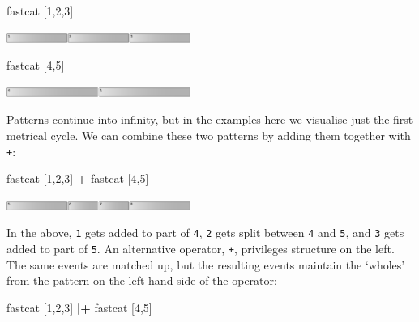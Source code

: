 \documentclass{nime-alternate} %
\newenvironment{Shaded}{\begin{snugshade}}{\end{snugshade}}
\newcommand{\DecValTok}[1]{\textcolor[rgb]{0.00,0.00,0.81}{#1}}
\newcommand{\NormalTok}[1]{#1}
\newcommand{\OperatorTok}[1]{\textcolor[rgb]{0.81,0.36,0.00}{\textbf{#1}}}
\begin{document}
\begin{Shaded}
\begin{Highlighting}[]
\NormalTok{fastcat [}\DecValTok{1}\NormalTok{,}\DecValTok{2}\NormalTok{,}\DecValTok{3}\NormalTok{]}
\end{Highlighting}
\end{Shaded}

\includegraphics[width=0.45\textwidth]{figures/2efc8e658200e8b94a2bd3f87ef273ce_0.pdf}

\begin{Shaded}
\begin{Highlighting}[]
\NormalTok{fastcat [}\DecValTok{4}\NormalTok{,}\DecValTok{5}\NormalTok{]}
\end{Highlighting}
\end{Shaded}

\includegraphics[width=0.45\textwidth]{figures/a5de1a12bad00c7c2d103e9b5e3f75f5_0.pdf}

Patterns continue into infinity, but in the examples here we visualise
just the first metrical cycle. We can combine these two patterns by
adding them together with \texttt{+}:

\begin{Shaded}
\begin{Highlighting}[]
\NormalTok{fastcat [}\DecValTok{1}\NormalTok{,}\DecValTok{2}\NormalTok{,}\DecValTok{3}\NormalTok{] }\OperatorTok{+}\NormalTok{ fastcat [}\DecValTok{4}\NormalTok{,}\DecValTok{5}\NormalTok{]}
\end{Highlighting}
\end{Shaded}

\includegraphics[width=0.45\textwidth]{figures/5a95fc0670ae3bb993fa97b33c8937f8_0.pdf}

In the above, \texttt{1} gets added to part of \texttt{4}, \texttt{2}
gets split between \texttt{4} and \texttt{5}, and \texttt{3} gets added
to part of \texttt{5}. An alternative operator, \texttt{\textbar{}+},
privileges structure on the left. The same events are matched up, but
the resulting events maintain the `wholes' from the pattern on the left
hand side of the operator:

\begin{Shaded}
\begin{Highlighting}[]
\NormalTok{fastcat [}\DecValTok{1}\NormalTok{,}\DecValTok{2}\NormalTok{,}\DecValTok{3}\NormalTok{] }\OperatorTok{|+}\NormalTok{ fastcat [}\DecValTok{4}\NormalTok{,}\DecValTok{5}\NormalTok{]}
\end{Highlighting}
\end{Shaded}
\end{document}
